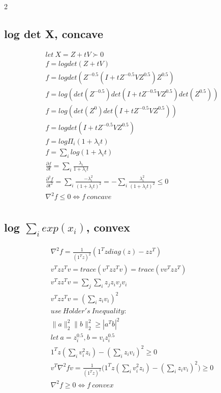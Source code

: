 \documentclass[8pt]{extarticle}
\begin{document}
\begin{multicols*}{2}
  \subsection{log det X, concave}
  \begin{align*}
    let\ X=Z+tV \succ 0\\
    f=log det(Z+tV)\\
    f=log det(Z^{-0.5}(I+tZ^{-0.5}VZ^{0.5})Z^{0.5})\\
    f=log (det(Z^{-0.5})det(I+tZ^{-0.5}VZ^{0.5})det(Z^{0.5}))\\
    f=log (det(Z^{0})det(I+tZ^{-0.5}VZ^{0.5}))\\
    f=log det(I+tZ^{-0.5}VZ^{0.5})\\
    f=log \Pi_i (1+\lambda_i t)\\
    f=\sum_i log(1+\lambda_i t)\\
    \frac{\partial f}{\partial t} = \sum_i \frac{\lambda_i}{1+\lambda_i t}\\
    \frac{\partial^2 f}{\partial t^2} = \sum_i \frac{-\lambda_i^2}{(1+\lambda_i t)^2} = -\sum_i \frac{\lambda_i^2}{(1+\lambda_i t)^2} \leq 0\\
    \nabla^2 f \leq 0 \iff f\ concave\\
  \end{align*}

  \vfill\null
  \columnbreak
    
  \subsection{log $\sum_i exp(x_i)$, convex}
  \begin{align*}
    \nabla^2 f = \frac{1}{(1^Tz)^2} (1^Tz diag(z) -zz^T)\\
    v^T zz^T v = trace(v^T zz^T v) = trace(vv^T zz^T)\\
    v^T zz^T v = \sum_j \sum_i z_j z_i v_j v_i\\
    v^T zz^T v = (\sum_i z_i v_i)^2\\
    use\ Holder's\ Inequality:\\
    \|a\|_2^2 \|b\|_2^2 \geq |a^Tb|^2\\
    let\ a = z_i^{0.5}, b=v_iz_i^{0.5}\\
    1^Tz(\sum_i v_i^2 z_i)-(\sum_i z_i v_i)^2 \geq 0\\
    v^T\nabla^2f v = \frac{1}{(1^Tz)^2} \bigg(1^Tz(\sum_i v_i^2 z_i)-(\sum_i z_i v_i)^2\bigg) \geq 0\\
    \nabla^2f \geq 0 \iff f\ convex
  \end{align*}  
  

\end{multicols*}
\end{document}
